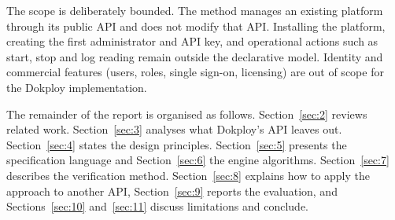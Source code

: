 The scope is deliberately bounded. The method manages an existing platform through its public API
and does not modify that API. Installing the platform, creating the first administrator and API key,
and operational actions such as start, stop and log reading remain outside the declarative model.
Identity and commercial features (users, roles, single sign-on, licensing) are out of scope for the
Dokploy implementation.

The remainder of the report is organised as follows. Section~\ref{sec:2} reviews related work. Section~\ref{sec:3} analyses
what Dokploy's API leaves out. Section~\ref{sec:4} states the design principles. Section~\ref{sec:5} presents the
specification language and Section~\ref{sec:6} the engine algorithms. Section~\ref{sec:7} describes the verification
method. Section~\ref{sec:8} explains how to apply the approach to another API, Section~\ref{sec:9} reports the evaluation,
and Sections~\ref{sec:10} and~\ref{sec:11} discuss limitations and conclude.
